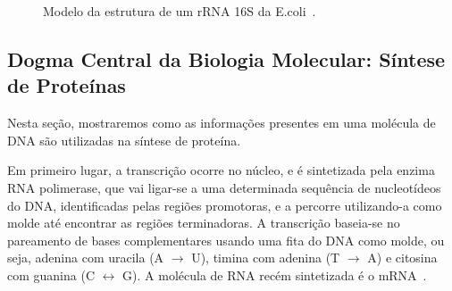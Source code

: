 \begin{figure}[htb!]
\centering
{}
\caption{Modelo da estrutura de um rRNA 16S da E.coli~\citep{gutell:1994}. \label{fig:rRNA}}
\end{figure}


\newpage
\subsection{Dogma Central da Biologia Molecular: Síntese de Proteínas}  \label{sec:Dogma}  %

Nesta seção, mostraremos como as informações presentes em uma molécula de DNA são utilizadas na síntese de proteína.


Em primeiro lugar, a transcrição ocorre no núcleo, e é sintetizada pela enzima RNA polimerase, que vai ligar-se a uma determinada sequência de nucleotídeos do DNA, identificadas pelas regiões promotoras, e a percorre utilizando-a como molde até encontrar as regiões terminadoras. A transcrição baseia-se no pareamento de bases complementares usando uma fita do DNA como molde, ou seja, adenina com uracila (A $\rightarrow$ U), timina com adenina (T $\rightarrow$  A) e citosina com guanina (C $\leftrightarrow$ G). A molécula de RNA recém sintetizada é o mRNA~\citep{lodish:2005}.

